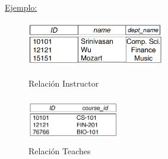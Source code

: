 \documentclass[12pt,a4paper]{report}
\begin{document}
		\vspace{5mm}
		\par \underline{Ejemplo:}
		\begin{figure}[htb]
				\centering
				\includegraphics[width=6cm, height=2cm]{./imagenes/re1.png}
				\caption{Relación Instructor}
				\vspace{5mm}
				\includegraphics[width=4cm, height=2cm]{./imagenes/re2.png}
				\caption{Relación Teaches}
		\end{figure}
\end{document}
